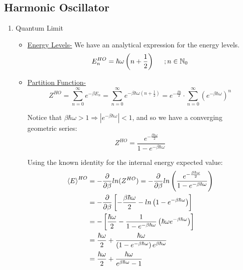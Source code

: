 \documentclass{article}
\numberwithin{equation}{subsection}
\begin{document}
\subsection{Harmonic Oscillator}
\begin{enumerate}[label=\textbf{\Alph*.}]
\item{Quantum Limit}

    \begin{itemize}
        \item \underline{Energy Levels-} We have an analytical expression for the energy levels. 
        \begin{equation}
            E_n^{HO}= \hbar\omega \left( n+\frac{1}{2} \right)   \hspace{0.5cm} ;n \in \mathbb{N}_0
        \end{equation}
    
        \item \underline{Partition Function-} 
        \begin{equation}
            Z^{HO} = \sum_{n=0}^{\infty}e^{-\beta E_n} = \sum_{n=0}^{\infty}e^{-\beta \hbar\omega \left( n+\frac{1}{2} \right)} =e^{-\frac{\beta \hbar}{2}} \cdot \sum_{n=0}^{\infty} \left( e^{-\beta \hbar \omega}\right)^n
        \end{equation}
    
        \bigskip
    
        Notice that $\beta \hbar \omega > 1 \Rightarrow |e^{-\beta \hbar \omega}| < 1$, and so we have a converging geometric series:
        \begin{equation}
            Z^{HO} = \frac{e^ {- \frac{\beta \hbar \omega}{2} } }{1-e^{-\beta \hbar \omega} }
        \end{equation}
    
        \bigskip
    
        Using the known identity for the internal energy expected value:
        \begin{equation}
        \begin{split}        
            \expval{E}^{HO} &= -\frac{\partial}{\partial \beta}ln(Z^{HO}) =
            -\frac{\partial}{\partial \beta}ln \left( \frac{e^ {- \frac{\beta \hbar \omega}{2} } }{1-e^{-\beta \hbar \omega} } \right) 
            \\ 
            &= -\frac{\partial}{\partial \beta} \left[ -\frac{\beta \hbar \omega}{2} - ln \left( 1-e^{-\beta \hbar \omega} \right) \right] \\ 
            &= - \left[ \frac{\hbar \omega}{2} - \frac{1}{1-e^{-\beta \hbar \omega} }\left( \hbar \omega e^{- \beta \hbar \omega} \right) \right] 
            \\ 
            &= \frac{\hbar \omega}{2} + \frac{\hbar \omega}{ \left(1-e^{-\beta \hbar \omega} \right) e^{\beta \hbar \omega} } 
            \\ 
            &= \frac{\hbar \omega}{2} + \frac{\hbar \omega}{e^{\beta \hbar \omega} - 1}
        \end{split}
        \end{equation}
    

\end{itemize}
\end{enumerate}
\end{document}
